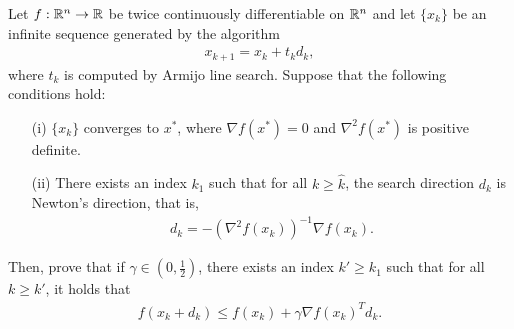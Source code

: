 \documentclass{ExerciseSheet}
\newif\ifsolutions
\begin{document}
\begin{problem}
 Let $f:\mathbb{R}^n\rightarrow \mathbb{R}$ be twice continuously differentiable on $\mathbb{R}^n$ and let $\{x_k\}$ be an infinite sequence generated by the algorithm
 \begin{align*}
     x_{k+1}=x_k+t_k d_k,
 \end{align*}
 where $t_k$ is computed by Armijo line search. Suppose that the following conditions hold:
 \begin{itemize}
     \item[(i)] $\{x_k\}$ converges to $x^*$, where $\nabla f(x^*)=0$ and $\nabla^2 f(x^*)$ is positive definite.
     \item[(ii)] There exists an index $k_1$ such that for all $k \geq \hat{k}$, the search direction $d_k$ is Newton's direction, that is,
     \begin{align*}
         d_k = -(\nabla^2 f(x_k))^{-1} \nabla f(x_k).
     \end{align*}
 \end{itemize}
 Then, prove that if $\gamma \in \left(0,\frac{1}{2}\right)$, there exists an index $k' \geq k_1$ such that for all $k\geq k'$, it holds that
 \begin{align*}
     f(x_k+d_k) \leq f(x_k)+\gamma\nabla f(x_k)^T d_k.
 \end{align*}
\end{problem}

\ifsolutions
\vskip 0.3cm
\end{document}
